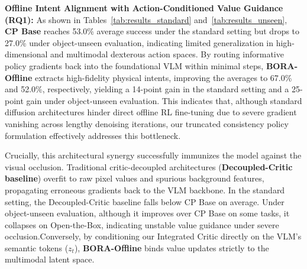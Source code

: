 \documentclass{article}
\begin{document}
\textbf{Offline Intent Alignment with Action-Conditioned Value Guidance (RQ1):}
As shown in Tables~\ref{tab:results_standard} and~\ref{tab:results_unseen}, \textbf{CP Base} reaches 53.0\% average success under the standard setting but drops to 27.0\% under object-unseen evaluation, indicating limited generalization in high-dimensional and multimodal dexterous action spaces. By routing informative policy gradients back into the foundational VLM within minimal steps, \textbf{BORA-Offline} extracts high-fidelity physical intents, improving the averages to 67.0\% and 52.0\%, respectively, yielding a 14-point gain in the standard setting and a 25-point gain under object-unseen evaluation. 
This indicates that, although standard diffusion architectures hinder direct offline RL fine-tuning due to severe gradient vanishing across lengthy denoising iterations, our truncated consistency policy formulation effectively addresses this bottleneck.

Crucially, this architectural synergy successfully immunizes the model against the visual occlusion. Traditional critic-decoupled architectures (\textbf{Decoupled-Critic baseline}) overfit to raw pixel values and spurious background features, propagating erroneous gradients back to the VLM backbone. In the standard setting, the Decoupled-Critic baseline falls below CP Base on average. Under object-unseen evaluation, although it improves over CP Base on some tasks, it collapses on Open-the-Box, indicating unstable value guidance under severe occlusion.Conversely, by conditioning our Integrated Critic directly on the VLM's semantic tokens ($z_t$), \textbf{BORA-Offline} binds value updates strictly to the multimodal latent space.


\end{document}
